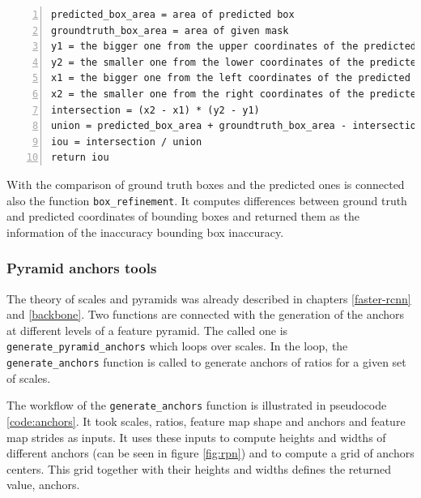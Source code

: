 {\scriptsize
\begin{lstlisting}[style=python, caption={compute\_iou}, captionpos=b, 
label=code:iou, deletekeywords={from, and},
backgroundcolor = \color{light-gray}, numbers=left, breaklines=true]
predicted_box_area = area of predicted box
groundtruth_box_area = area of given mask
y1 = the bigger one from the upper coordinates of the predicted and ground truth bboxes
y2 = the smaller one from the lower coordinates of the predicted and ground truth bboxes
x1 = the bigger one from the left coordinates of the predicted and ground truth bboxes
x2 = the smaller one from the right coordinates of the predicted and ground truth bboxes
intersection = (x2 - x1) * (y2 - y1)
union = predicted_box_area + groundtruth_box_area - intersection
iou = intersection / union
return iou
\end{lstlisting}}

With the comparison of ground truth boxes and the predicted ones is connected 
also the function \verb|box_refinement|. It computes differences between ground 
truth and predicted coordinates of bounding boxes and returned them as the 
information of the inaccuracy bounding box inaccuracy.


\subsubsection{Pyramid anchors tools}
\label{anchors-func}

The theory of scales and pyramids was already described in chapters 
\ref{faster-rcnn} and \ref{backbone}. Two functions are connected with the 
generation of the anchors at different levels of a feature pyramid. The called 
one is \verb|generate_pyramid_anchors| which loops over scales. In the loop, the 
\verb|generate_anchors| function is called to generate anchors of ratios for a 
given set of scales. 

The workflow of the \verb|generate_anchors| function is illustrated in 
pseudocode \ref{code:anchors}. It took scales, ratios, feature map shape and 
anchors and feature map strides as inputs. It uses these inputs to compute 
heights and widths of different anchors (can be seen in figure \ref{fig:rpn}) 
and to compute a grid of anchors centers. This grid together with their heights 
and widths defines the returned value, anchors.

